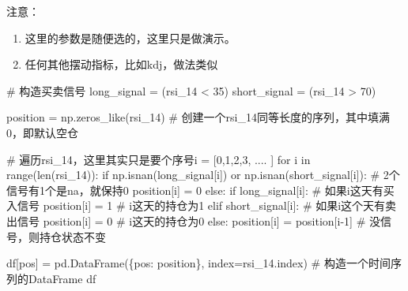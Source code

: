 \documentclass[
  letterpaper,
  DIV=11,
  numbers=noendperiod]{scrreprt}
\newenvironment{Shaded}{\begin{snugshade}}{\end{snugshade}}
\newcommand{\BuiltInTok}[1]{\textcolor[rgb]{0.00,0.23,0.31}{#1}}
\newcommand{\CommentTok}[1]{\textcolor[rgb]{0.37,0.37,0.37}{#1}}
\newcommand{\ControlFlowTok}[1]{\textcolor[rgb]{0.00,0.23,0.31}{#1}}
\newcommand{\DecValTok}[1]{\textcolor[rgb]{0.68,0.00,0.00}{#1}}
\newcommand{\KeywordTok}[1]{\textcolor[rgb]{0.00,0.23,0.31}{#1}}
\newcommand{\NormalTok}[1]{\textcolor[rgb]{0.00,0.23,0.31}{#1}}
\newcommand{\OperatorTok}[1]{\textcolor[rgb]{0.37,0.37,0.37}{#1}}
\newcommand{\StringTok}[1]{\textcolor[rgb]{0.13,0.47,0.30}{#1}}
\providecommand{\tightlist}{%
  \setlength{\itemsep}{0pt}\setlength{\parskip}{0pt}}\usepackage{longtable,booktabs,array}
\begin{document}
注意：

\begin{enumerate}
\def\labelenumi{\arabic{enumi}.}
\tightlist
\item
  这里的参数是随便选的，这里只是做演示。
\item
  任何其他摆动指标，比如kdj，做法类似
\end{enumerate}

\begin{Shaded}
\begin{Highlighting}[]
\CommentTok{\# 构造买卖信号}
\NormalTok{long\_signal }\OperatorTok{=}\NormalTok{ (rsi\_14 }\OperatorTok{\textless{}} \DecValTok{35}\NormalTok{)}
\NormalTok{short\_signal }\OperatorTok{=}\NormalTok{ (rsi\_14 }\OperatorTok{\textgreater{}} \DecValTok{70}\NormalTok{)}
\end{Highlighting}
\end{Shaded}

\begin{Shaded}
\begin{Highlighting}[]
\NormalTok{position }\OperatorTok{=}\NormalTok{ np.zeros\_like(rsi\_14)  }\CommentTok{\# 创建一个rsi\_14同等长度的序列，其中填满0，即默认空仓}


\CommentTok{\# 遍历rsi\_14，这里其实只是要个序号i = [0,1,2,3, .... ]}
\ControlFlowTok{for}\NormalTok{ i }\KeywordTok{in} \BuiltInTok{range}\NormalTok{(}\BuiltInTok{len}\NormalTok{(rsi\_14)):}
    \ControlFlowTok{if}\NormalTok{ np.isnan(long\_signal[i]) }\KeywordTok{or}\NormalTok{ np.isnan(short\_signal[i]):  }\CommentTok{\# 2个信号有1个是na，就保持0}
\NormalTok{        position[i] }\OperatorTok{=} \DecValTok{0}
    \ControlFlowTok{else}\NormalTok{:}
        \ControlFlowTok{if}\NormalTok{ long\_signal[i]:  }\CommentTok{\# 如果i这天有买入信号}
\NormalTok{            position[i] }\OperatorTok{=} \DecValTok{1}  \CommentTok{\# i这天的持仓为1}
        \ControlFlowTok{elif}\NormalTok{ short\_signal[i]:  }\CommentTok{\# 如果i这个天有卖出信号}
\NormalTok{            position[i] }\OperatorTok{=} \DecValTok{0}  \CommentTok{\# i这天的持仓为0}
        \ControlFlowTok{else}\NormalTok{:}
\NormalTok{            position[i] }\OperatorTok{=}\NormalTok{ position[i}\OperatorTok{{-}}\DecValTok{1}\NormalTok{] }\CommentTok{\# 没信号，则持仓状态不变}

\NormalTok{df[}\StringTok{\textquotesingle{}pos\textquotesingle{}}\NormalTok{] }\OperatorTok{=}\NormalTok{ pd.DataFrame(\{}\StringTok{\textquotesingle{}pos\textquotesingle{}}\NormalTok{: position\}, index}\OperatorTok{=}\NormalTok{rsi\_14.index) }\CommentTok{\# 构造一个时间序列的DataFrame}
\NormalTok{df}
\end{Highlighting}
\end{Shaded}
\end{document}
